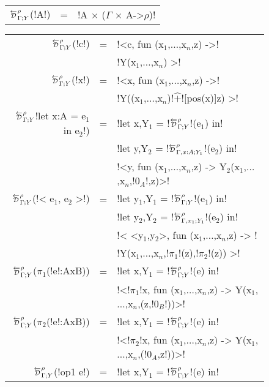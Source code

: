 \begin{figure*}[t]
    \begin{tabular}{r c l}
        $\directD{\rho}{\Gamma}{Y}$(!A!) &=& !A $\times$ ($\Gamma$ $\times$ A->$\rho$)!\\
    \end{tabular}
    \medskip

    \begin{tabular}{r c l}
        $\directD{\rho}{\Gamma}{Y}$(!c!) &=& 
            !<c, fun (x$_{1}$,$\ldots$,x$_n$,z) ->! \\
            && !Y(x$_{1}$,$\ldots$,x$_{n}$) >!\\
        $\directD{\rho}{\Gamma}{Y}$(!x!) &=& 
            !<x, fun (x$_{1}$,$\ldots$,x$_n$,z) ->! \\
            && !Y((x$_{1}$,$\ldots$,x$_n$)!$\widehat{+}$![pos(x)]z) >!\\
        $\directD{\rho}{\Gamma}{Y}$!let x:A = e$_{1}$ in e$_{2}$!) &=& 
            !let x,Y$_{1}$ = !$\directD{\rho}{\Gamma}{Y}$!(e$_{1}$) in! \\
            &&!let y,Y$_{2}$ = !$\directD{\rho}{\Gamma,x:A}{Y_1}$!(e$_{2}$) in!\\ 
            &&!<y, fun (x$_{1}$,$\ldots$,x$_n$,z) -> Y$_{2}$(x$_{1}$,$\ldots$,x$_n$,!$0_{A}$!,z)>!\\
        $\directD{\rho}{\Gamma}{Y}$(!< e$_{1}$, e$_{2}$ >!) &=&
            !let y$_{1}$,Y$_{1}$ = !$\directD{\rho}{\Gamma}{Y}$!(e$_{1}$) in! \\
            &&!let y$_{2}$,Y$_{2}$ = !$\directD{\rho}{\Gamma,x_1}{Y_1}$!(e$_{2}$) in!\\
            &&!< <y$_{1}$,y$_{2}$>, fun (x$_{1}$,$\ldots$,x$_n$,z) -> !\\
            &&!Y(x$_{1}$,$\ldots$,x$_n$,!$\pi_1$!(z),!$\pi_2$!(z)) >!\\ 
        $\directD{\rho}{\Gamma}{Y}$($\pi_1$(!e!:AxB)) &=&
            !let x,Y$_{1}$ = !$\directD{\rho}{\Gamma}{Y}$!(e) in! \\
            && !<!$\pi_1$!x, fun (x$_{1}$,$\ldots$,x$_n$,z) -> Y(x$_{1}$,$\ldots$,x$_n$,(z,!$0_B$!))>! \\
        $\directD{\rho}{\Gamma}{Y}$($\pi_2$(!e!:AxB)) &=&
            !let x,Y$_{1}$ = !$\directD{\rho}{\Gamma}{Y}$!(e) in! \\
            && !<!$\pi_2$!x, fun (x$_{1}$,$\ldots$,x$_n$,z) -> Y(x$_{1}$,$\ldots$,x$_n$,(!$0_A$,z!))>! \\
        $\directD{\rho}{\Gamma}{Y}$(!op1 e!) &=&  
            !let x,Y$_{1}$ = !$\directD{\rho}{\Gamma}{Y}$!(e) in! \\

\end{tabular}
\end{figure*}
